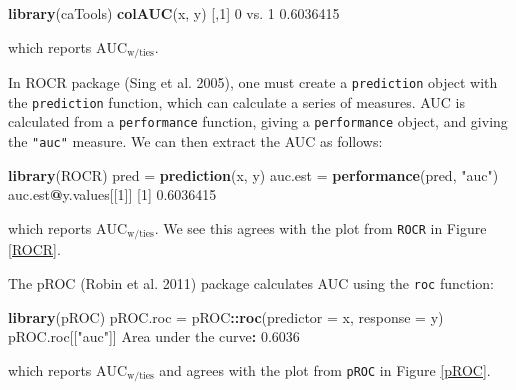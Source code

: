 \documentclass[smallextended]{svjour3}       %
\newenvironment{Shaded}{\begin{snugshade}}{\end{snugshade}}
\newcommand{\DataTypeTok}[1]{\textcolor[rgb]{0.13,0.29,0.53}{#1}}
\newcommand{\DecValTok}[1]{\textcolor[rgb]{0.00,0.00,0.81}{#1}}
\newcommand{\FloatTok}[1]{\textcolor[rgb]{0.00,0.00,0.81}{#1}}
\newcommand{\KeywordTok}[1]{\textcolor[rgb]{0.13,0.29,0.53}{\textbf{#1}}}
\newcommand{\NormalTok}[1]{#1}
\newcommand{\OperatorTok}[1]{\textcolor[rgb]{0.81,0.36,0.00}{\textbf{#1}}}
\newcommand{\StringTok}[1]{\textcolor[rgb]{0.31,0.60,0.02}{#1}}
\begin{document}
\begin{Shaded}
\begin{Highlighting}[]
\KeywordTok{library}\NormalTok{(caTools)}
\KeywordTok{colAUC}\NormalTok{(x, y)}
\NormalTok{             [,}\DecValTok{1}\NormalTok{]}
\DecValTok{0}\NormalTok{ vs. }\DecValTok{1} \FloatTok{0.6036415}
\end{Highlighting}
\end{Shaded}

which reports \(\text{AUC}_{\text{w/ties}}\).

In {\selectfont ROCR} package (Sing et al. 2005), one must
create a \texttt{prediction} object with the \texttt{prediction}
function, which can calculate a series of measures. AUC is calculated
from a \texttt{performance} function, giving a \texttt{performance}
object, and giving the \texttt{"auc"} measure. We can then extract the
AUC as follows:

\begin{Shaded}
\begin{Highlighting}[]
\KeywordTok{library}\NormalTok{(ROCR)}
\NormalTok{pred =}\StringTok{ }\KeywordTok{prediction}\NormalTok{(x, y)}
\NormalTok{auc.est =}\StringTok{ }\KeywordTok{performance}\NormalTok{(pred, }\StringTok{"auc"}\NormalTok{)}
\NormalTok{auc.est}\OperatorTok{@}\NormalTok{y.values[[}\DecValTok{1}\NormalTok{]]}
\NormalTok{[}\DecValTok{1}\NormalTok{] }\FloatTok{0.6036415}
\end{Highlighting}
\end{Shaded}

which reports \(\text{AUC}_{\text{w/ties}}\). We see this agrees with
the plot from \texttt{ROCR} in Figure \ref{ROCR}.

The {\selectfont pROC} (Robin et al. 2011) package
calculates AUC using the \texttt{roc} function:

\begin{Shaded}
\begin{Highlighting}[]
\KeywordTok{library}\NormalTok{(pROC)}
\NormalTok{pROC.roc =}\StringTok{ }\NormalTok{pROC}\OperatorTok{::}\KeywordTok{roc}\NormalTok{(}\DataTypeTok{predictor =}\NormalTok{ x, }\DataTypeTok{response =}\NormalTok{ y)}
\NormalTok{pROC.roc[[}\StringTok{"auc"}\NormalTok{]]}
\NormalTok{Area under the curve}\OperatorTok{:}\StringTok{ }\FloatTok{0.6036}
\end{Highlighting}
\end{Shaded}

which reports \(\text{AUC}_{\text{w/ties}}\) and agrees with the plot
from \texttt{pROC} in Figure \ref{pROC}.
\end{document}

